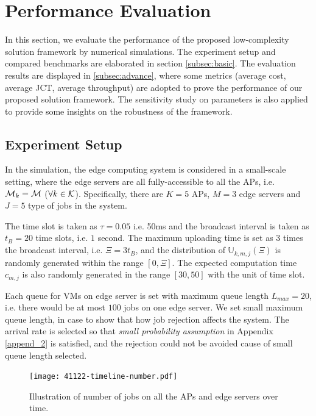 \section{Performance Evaluation}
\label{sec:evaluation}
In this section, we evaluate the performance of the proposed low-complexity solution framework by numerical simulations.
The experiment setup and compared benchmarks are elaborated in section \ref{subsec:basic}.
The evaluation results are displayed in \ref{subsec:advance}, where some metrics (average cost, average JCT, average throughput) are adopted to prove the performance of our proposed solution framework.
The sensitivity study on parameters is also applied to provide some insights on the robustness of the framework.

\subsection{Experiment Setup}
\label{subsec:setup}
In the simulation, the edge computing system is considered in a small-scale setting, where the edge servers are all fully-accessible to all the APs, i.e. $\mathcal{M}_{k}=\mathcal{M}$ ($\forall k\in\mathcal{K}$). 
Specifically, there are $K=5$ APs, $M=3$ edge servers and $J=5$ type of jobs in the system.

The time slot is taken as $\tau = 0.05$ i.e. 50ms and the broadcast interval is taken as $t_{B}=20$ time slots, i.e. $1$ second.
The maximum uploading time is set as $3$ times the broadcast interval, i.e. $\Xi = 3t_B$, and the distribution of $\mathbb{U}_{k,m,j}(\Xi)$ is randomly generated within the range $[0, \Xi]$.
The expected computation time $c_{m,j}$ is also randomly generated in the range $[30,50]$ with the unit of time slot.

Each queue for VMs on edge server is set with maximum queue length $L_{max}=20$, i.e. there would be at most $100$ jobs on one edge server.
We set small maximum queue length, in case to show that how job rejection affects the system.
The arrival rate is selected so that \emph{small probability assumption} in Appendix \ref{append_2} is satisfied, and the rejection could not be avoided cause of small queue length selected.

\begin{figure}[ht!]                                                                            %
    \centering                                                                                  %
    \texttt{[image: 41122-timeline-number.pdf]}                           %
    \caption{Illustration of number of jobs on all the APs and edge servers over time.}         %
    \label{fig:general_timeline}                                                                %
\end{figure}                                                                                   %

